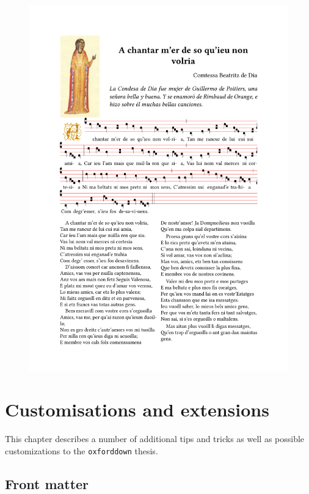 \documentclass[a4paper, twoside]{templates/ociamthesis}
\begin{document}
\begin{figure}[ht]

{\centering \includegraphics[width=1\linewidth]{figures/audicions/achantar} 

}

\end{figure}

\hypertarget{customisations-and-extensions}{%
\chapter{Customisations and extensions}\label{customisations-and-extensions}}

\minitoc 

\noindent This chapter describes a number of additional tips and tricks as well as possible customizations to the \texttt{oxforddown} thesis.

\hypertarget{front-matter}{%
\section{Front matter}\label{front-matter}}
\end{document}
